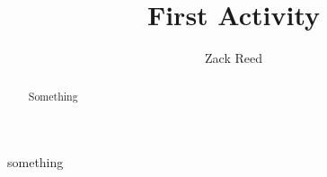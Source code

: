 \documentclass{ximera}
\author{Zack Reed}
\title{First Activity}
\begin{document}
\begin{abstract}
Something
\end{abstract}
\maketitle

something
\end{document}
